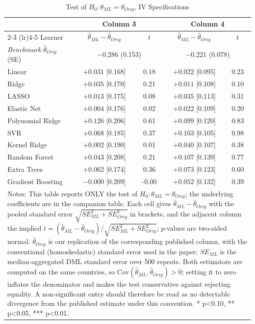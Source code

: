 \begin{table}[htbp]
\centering
\caption{Test of $H_0:\theta_{ML}=\theta_{Orig}$, IV Specifications}
\label{tab:iv_difference_test}
\begin{tabular}{lcccc}
\toprule
 & \multicolumn{2}{c}{Column 3} & \multicolumn{2}{c}{Column 4} \\
\cmidrule(lr){2-3} \cmidrule(lr){4-5}
Learner & $\hat\theta_{ML}-\hat\theta_{Orig}$ & $t$ & $\hat\theta_{ML}-\hat\theta_{Orig}$ & $t$ \\
\midrule
\textit{Benchmark} $\hat\theta_{Orig}$ (SE) & \multicolumn{2}{c}{$-0.286$ (0.153)} & \multicolumn{2}{c}{$-0.221$ (0.078)} \\
\midrule
Linear & $+0.031$ [0.168] & 0.18 & $+0.022$ [0.095] & 0.23 \\
Ridge & $+0.035$ [0.170] & 0.21 & $+0.011$ [0.108] & 0.10 \\
LASSO & $+0.013$ [0.175] & 0.08 & $+0.035$ [0.113] & 0.31 \\
Elastic Net & $+0.004$ [0.176] & 0.02 & $+0.022$ [0.109] & 0.20 \\
Polynomial Ridge & $+0.126$ [0.206] & 0.61 & $+0.099$ [0.120] & 0.83 \\
SVR & $+0.068$ [0.185] & 0.37 & $+0.103$ [0.105] & 0.98 \\
Kernel Ridge & $+0.002$ [0.190] & 0.01 & $+0.040$ [0.107] & 0.38 \\
Random Forest & $+0.043$ [0.208] & 0.21 & $+0.107$ [0.139] & 0.77 \\
Extra Trees & $+0.062$ [0.174] & 0.36 & $+0.073$ [0.123] & 0.60 \\
Gradient Boosting & $-0.000$ [0.209] & -0.00 & $+0.052$ [0.132] & 0.39 \\
\bottomrule
\multicolumn{5}{p{0.95\linewidth}}{\footnotesize Notes: This table reports ONLY the test of $H_0:\theta_{ML}=\theta_{Orig}$; the underlying coefficients are in the companion table. Each cell gives $\hat\theta_{ML}-\hat\theta_{Orig}$ with the pooled standard error $\sqrt{SE_{ML}^2+SE_{Orig}^2}$ in brackets, and the adjacent column the implied $t=(\hat\theta_{ML}-\hat\theta_{Orig})/\sqrt{SE_{ML}^2+SE_{Orig}^2}$; $p$-values are two-sided normal. $\hat\theta_{Orig}$ is our replication of the corresponding published column, with the conventional (homoskedastic) standard error used in the paper; $SE_{ML}$ is the median-aggregated DML standard error over 500 repeats. Both estimators are computed on the same countries, so $\mathrm{Cov}(\hat\theta_{ML},\hat\theta_{Orig})>0$; setting it to zero inflates the denominator and makes the test conservative against rejecting equality. A non-significant entry should therefore be read as no detectable divergence from the published estimate under this convention. * p<0.10, ** p<0.05, *** p<0.01.}\\
\end{tabular}
\end{table}
